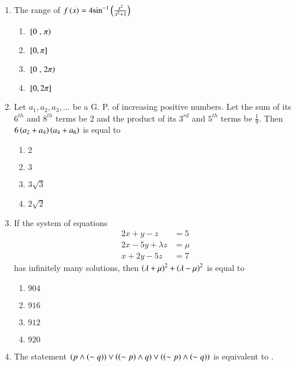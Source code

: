 \documentclass[journal]{IEEEtran}
\theoremstyle{remark}
\begin{document}
\begin{enumerate}
\item The range of $f\left(x\right)=4{\sin}^{-1}\left(\frac{x^2}{x^2+1}\right)$

\begin{multicols}{4}
\begin{enumerate}
\item ${}\left[0\right.,\left.\pi\right)$
\item ${}\left[0,\pi\right]$
\item ${}\left[0\right.,\left.2\pi\right)$
\item ${}\left[0,2\pi\right]$
\end{enumerate}
\end{multicols}

\item Let $a_1, a_2, a_3, \dots$ be a G. P. of increasing positive numbers. Let the sum of its $6^{th}$ and $8^{th}$ terms be 2 and the product of its $3^{rd}$ and $5^{th}$ terms be $\frac{1}{9}$. Then $6\left(a_2 + a_4\right)\left( a_4 + a_6\right)$ is equal to

\begin{multicols}{4}
\begin{enumerate}
\item $2$
\item $3$
\item $3\sqrt{3}$
\item $2\sqrt{2}$
\end{enumerate}
\end{multicols}

\item If the system of equations
\begin{align*}
2x+y -z&=5\\
2x-5y+\lambda z&=\mu\\
x+2y-5z&=7
\end{align*}
has infinitely many solutions, then ${\left(\lambda+\mu\right)}^2+{\left(\lambda-\mu\right)}^2$ is equal to

\begin{multicols}{4}
\begin{enumerate}
\item $904$
\item $916$
\item $912$
\item $920$
\end{enumerate}
\end{multicols}

\item The statement $\left(p\land\left(\sim q\right)\right)\lor\left(\left(\sim p\right)\land q\right)\lor\left(\left(\sim p\right)\land \left(\sim q\right)\right)$ is equivalent to .


\end{enumerate}
\end{document}
